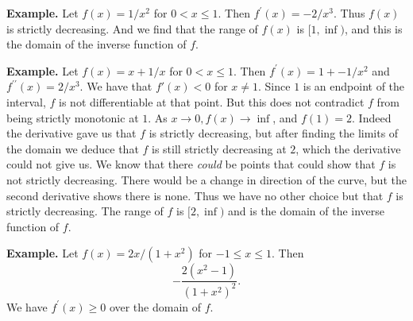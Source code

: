   \textbf{Example.} Let $f(x) = 1/x^2$ for $0 < x \le 1$. Then $f^\prime(x) = -2/x^3$. Thus $f(x)$ is strictly decreasing. And we find that the range of $f(x)$ is $[1, \inf)$, and this is the domain of the inverse function of $f$.

    \textbf{Example.} Let $f(x) = x + 1/x$ for $0 < x \le 1$. Then $f^\prime(x) = 1 + -1/x^2$ and $f^{\prime\prime}(x) = 2/x^3$. We have that $f'(x) < 0$ for $x \ne 1$. Since $1$ is an endpoint of the interval, $f$ is not differentiable at that point. But this does not contradict $f$ from being strictly monotonic at $1$. As $x \to 0, f(x) \to \inf$, and $f(1) = 2$. Indeed the derivative gave us that $f$ is strictly decreasing, but after finding the limits of the domain we deduce that $f$ is still strictly decreasing at $2$, which the derivative could not give us. We know that there \textit{could} be points that could show that $f$ is not strictly decreasing. There would be a change in direction of the curve, but the second derivative shows there is none. Thus we have no other choice but that $f$ is strictly decreasing. The range of $f$ is $[2, \inf)$ and is the domain of the inverse function of $f$.

      \textbf{Example.} Let $f(x) = 2x/(1 + x^2)$ for $-1 \le x \le 1$. Then
      \[-\frac{2(x^2 - 1)}{(1 + x^2)^2}.\]
      We have $f^\prime(x) \ge 0$ over the domain of $f$. 
